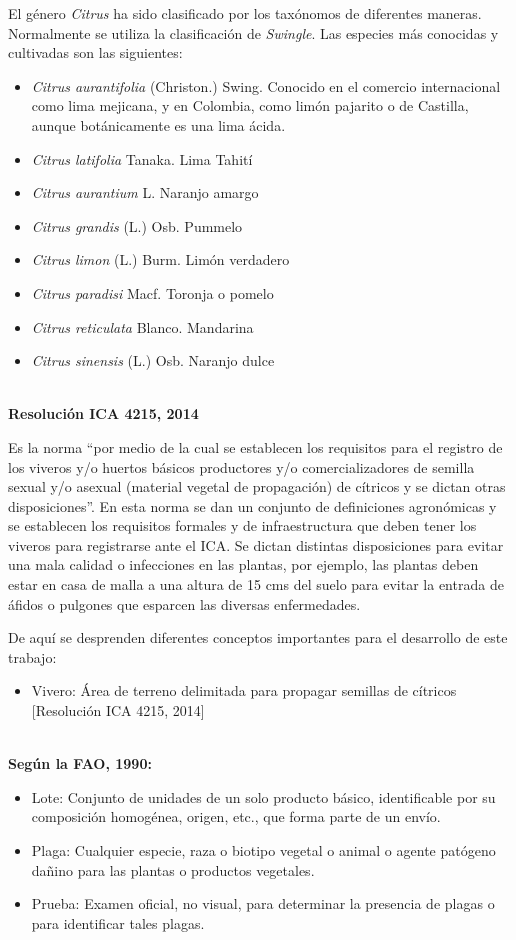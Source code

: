 El g\'{e}nero \textit{Citrus} ha sido clasificado por los tax\'{o}nomos de diferentes maneras. Normalmente se utiliza la clasificaci\'{o}n de \textit{Swingle}. Las especies m\'{a}s conocidas y cultivadas son las siguientes: 
\begin{itemize}
\item \textit{Citrus aurantifolia} (Christon.) Swing. Conocido en el comercio internacional como lima mejicana, y en Colombia, como lim\'{o}n pajarito o de Castilla, aunque bot\'{a}nicamente es una lima \'{a}cida.
\item \textit{Citrus latifolia} Tanaka. Lima Tahit\'{i}
\item \textit{Citrus aurantium} L. Naranjo amargo
\item \textit{Citrus grandis} (L.) Osb. Pummelo
\item \textit{Citrus limon} (L.) Burm. Lim\'{o}n verdadero
\item \textit{Citrus paradisi} Macf. Toronja o pomelo
\item \textit{Citrus reticulata} Blanco. Mandarina
\item \textit{Citrus sinensis} (L.) Osb. Naranjo dulce
\end{itemize}

~\\\textbf{Resoluci\'{o}n ICA 4215, 2014}

Es la norma ``por medio de la cual se establecen los requisitos para el registro de los viveros y/o huertos b\'{a}sicos productores y/o comercializadores de semilla sexual y/o asexual (material vegetal de propagaci\'{o}n) de c\'{i}tricos y se dictan otras disposiciones''. En esta norma se dan un conjunto de definiciones agron\'{o}micas y se establecen los requisitos formales y de infraestructura que deben tener los viveros para registrarse ante el ICA. Se dictan distintas disposiciones para evitar una mala calidad o infecciones en las plantas, por ejemplo, las plantas deben estar en casa de malla a una altura de 15 cms del suelo para evitar la entrada de \'{a}fidos o pulgones que esparcen las diversas enfermedades.

De aqu\'{i} se desprenden diferentes conceptos importantes para el desarrollo de este trabajo:
\begin{itemize}
\item Vivero: \'{A}rea de terreno delimitada para propagar semillas de c\'{i}tricos [Resoluci\'{o}n ICA 4215, 2014]
\end{itemize}

~\\\textbf{Seg\'{u}n la FAO, 1990:}
\begin{itemize}
\item Lote: Conjunto de unidades de un solo producto b\'{a}sico, identificable por su composici\'{o}n homog\'{e}nea, origen, etc., que forma parte de un env\'{i}o.
\item Plaga: Cualquier especie, raza o biotipo vegetal o animal o agente pat\'{o}geno da\~{n}ino para las plantas o productos vegetales.
\item Prueba: Examen oficial, no visual, para determinar la presencia de plagas o para identificar tales plagas. 
\end{itemize}

